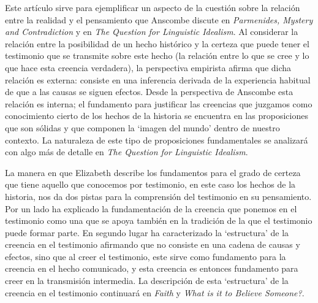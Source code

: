 Este artículo sirve para ejemplificar un aspecto de la cuestión sobre la relación entre la realidad y el pensamiento que Anscombe discute en \emph{Parmenides, Mystery and Contradiction} y en \emph{The Question for Linguistic Idealism}. Al considerar la relación entre la posibilidad de un hecho histórico y la certeza que puede tener el testimonio que se transmite sobre este hecho (la relación entre lo que se cree y lo que hace esta creencia verdadera), la perspectiva empirista afirma que dicha relación es externa: consiste en una inferencia derivada de la experiencia habitual de que a las causas se siguen efectos. Desde la perspectiva de Anscombe esta relación es interna; el fundamento para justificar las creencias que juzgamos como conocimiento cierto de los hechos de la historia se encuentra en las proposiciones que son sólidas y que componen la `imagen del mundo' dentro de nuestro contexto. La naturaleza de este tipo de proposiciones fundamentales se analizará con algo más de detalle en \emph{The Question for Linguistic Idealism}.

La manera en que Elizabeth describe los fundamentos para el grado de certeza que tiene aquello que conocemos por testimonio, en este caso los hechos de la historia, nos da dos pistas para la comprensión del testimonio en su pensamiento. Por un lado ha explicado la fundamentación de la creencia que ponemos en el testimonio como una que se apoya también en la tradición de la que el testimonio puede formar parte. En segundo lugar ha caracterizado la `estructura' de la creencia en el testimonio afirmando que no consiste en una cadena de causas y efectos, sino que al creer el testimonio, este sirve como fundamento para la creencia en el hecho comunicado, y esta creencia es entonces fundamento para creer en la transmisión intermedia. La descripción de esta `estructura' de la creencia en el testimonio continuará en \emph{Faith} y \emph{What is it to Believe Someone?}.
